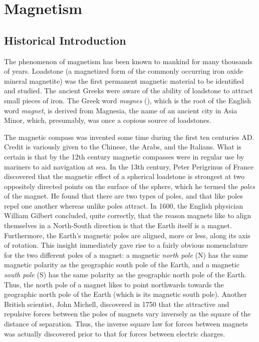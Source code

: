 \section{Magnetism}
\subsection{Historical Introduction}
The phenomenon of magnetism has been known to mankind for many thousands of years.
Loadstone (a magnetized form of the commonly occurring iron oxide
mineral magnetite) was the first permanent magnetic material to be identified and
studied. The ancient Greeks were aware of the ability of loadstone  to
attract small pieces of iron. The Greek word {\em magnes}\/ (), which is the root of the English word
{\em magnet},  is 
derived from Magnesia, the name of an ancient city in Asia Minor, which, presumably,
was once a copious source of loadstones. 

The magnetic compass was invented some time during the first ten centuries
AD. Credit is variously given to the Chinese, the Arabs, and the Italians.
What is certain is that by the 12th century magnetic compasses were in
regular use by mariners to aid navigation at sea. In the 13th century,
Peter Perigrinus of France discovered that the magnetic effect of
a spherical loadstone is strongest at two oppositely directed
points  on the surface of the
sphere, which he termed the {\em poles}\/ of the magnet. He found that
there are two types of poles, and that like poles repel one another
whereas unlike poles attract. In 1600, the English
physician William Gilbert concluded,
quite correctly, that the reason magnets like to align themselves in
a North-South direction is that the Earth itself is a magnet.
Furthermore, the Earth's magnetic poles are aligned, more or less,
along its axis of rotation. This insight immediately
gave rise to a fairly obvious
nomenclature for the two different poles of a magnet: a magnetic
{\em north pole}\/ (N) has the same magnetic polarity as the geographic south pole of the
Earth, and a magnetic {\em south pole}\/ (S) has the same polarity as the geographic north 
 pole of the
Earth. Thus, the north pole of a magnet likes to point northwards towards
the geographic north pole of the Earth (which is its magnetic south pole). 
Another British scientist, John Michell, discovered in
1750 that the attractive and repulsive forces between the poles of
magnets vary inversely as the square of the distance of separation.
Thus, the inverse square law for forces between
 magnets was actually discovered prior to
that for forces between electric charges. 

